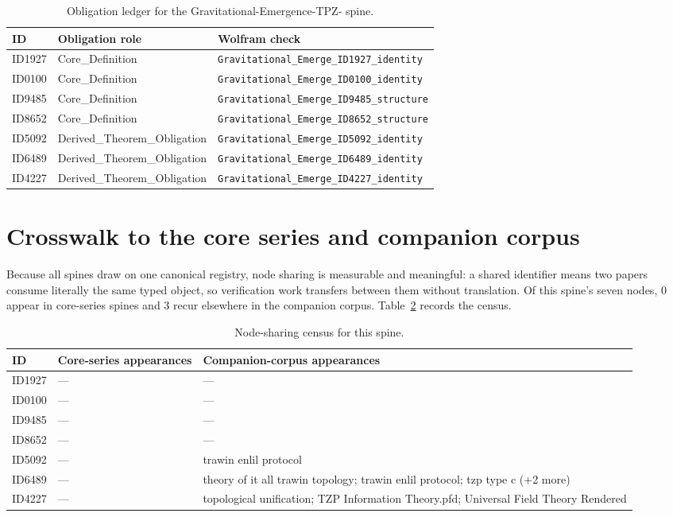 \documentclass[11pt]{article}
\theoremstyle{remark}
\begin{document}
\begin{table}[ht]
\centering
\small
\caption{Obligation ledger for the Gravitational-Emergence-TPZ- spine.}
\label{tab:obligations}
\begin{tabular}{llp{6.2cm}}
\toprule
ID & Obligation role & Wolfram check \\
\midrule
ID1927 & Core\_Definition & \texttt{Gravitational\_Emerge\_ID1927\_identity} \\
ID0100 & Core\_Definition & \texttt{Gravitational\_Emerge\_ID0100\_identity} \\
ID9485 & Core\_Definition & \texttt{Gravitational\_Emerge\_ID9485\_structure} \\
ID8652 & Core\_Definition & \texttt{Gravitational\_Emerge\_ID8652\_structure} \\
ID5092 & Derived\_Theorem\_Obligation & \texttt{Gravitational\_Emerge\_ID5092\_identity} \\
ID6489 & Derived\_Theorem\_Obligation & \texttt{Gravitational\_Emerge\_ID6489\_identity} \\
ID4227 & Derived\_Theorem\_Obligation & \texttt{Gravitational\_Emerge\_ID4227\_identity} \\
\bottomrule
\end{tabular}
\end{table}

\section{Crosswalk to the core series and companion corpus}
\label{sec:crosswalk}

Because all spines draw on one canonical registry, node sharing is measurable and meaningful: a shared identifier means two papers consume literally the same typed object, so verification work transfers between them without translation. Of this spine's seven nodes, 0 appear in core-series spines and 3 recur elsewhere in the companion corpus. Table~\ref{tab:crosswalk} records the census.

\begin{table}[ht]
\centering
\small
\caption{Node-sharing census for this spine.}
\label{tab:crosswalk}
\begin{tabular}{lp{4.4cm}p{6.6cm}}
\toprule
ID & Core-series appearances & Companion-corpus appearances \\
\midrule
ID1927 & --- & --- \\
ID0100 & --- & --- \\
ID9485 & --- & --- \\
ID8652 & --- & --- \\
ID5092 & --- & trawin enlil protocol \\
ID6489 & --- & theory of it all trawin topology; trawin enlil protocol; tzp type c (+2 more) \\
ID4227 & --- & topological unification; TZP Information Theory.pfd; Universal Field Theory Rendered \\
\bottomrule
\end{tabular}
\end{table}
\end{document}
